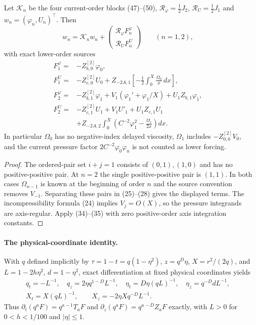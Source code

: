 \begin{proposition}
\label{prop:startup-source-check}
Let $\mathcal K_n$ be the four current-order blocks (47)--(50),
$\mathcal R_\varphi=\tfrac12J_2$, $\mathcal R_U=\tfrac12J_1$
and $w_n=(\varphi_n,U_n)^\top$. Then
\[
w_n=\mathcal K_nw_n+
\begin{pmatrix}\mathcal R_\varphi F_n^\varphi\\
\mathcal R_U F_n^U\end{pmatrix}\qquad(n=1,2),
\]
with exact lower-order sources
\begin{align*}
F_1^\varphi={}&-Z_{b,0}^{[2]}\varphi_0,\\
F_1^U={}&-Z_{c,0}^{[2]}U_0+
 Z_{-2A,1}\left[-\frac12\int_0^X\frac{\Omega_0}{x}\,dx\right],\\
F_2^\varphi={}&-Z_{b,1}^{[2]}\varphi_1+
 V_1(\varphi_1'+\varphi_1/X)+U_1Z_{b,1}\varphi_1,\\
F_2^U={}&-Z_{c,1}^{[2]}U_1+V_1U'_1+U_1Z_{c,1}U_1\\
&+Z_{-2A,2}\int_0^X
  \left(C^{-2}\varphi_1^2-\frac{\Omega_1}{2x}\right)dx .
\end{align*}
In particular $\Omega_0$ has no negative-index delayed viscosity,
$\Omega_1$ includes $-Z^{[2]}_{0,0}V_0$, and the current pressure
factor $2C^{-2}\varphi_0\varphi_n$ is not counted as lower forcing.
\end{proposition}
\begin{proof}
The ordered-pair set $i+j=1$ consists of $(0,1),(1,0)$ and
has no positive-positive pair. At $n=2$ the single positive-positive
pair is $(1,1)$. In both cases $\Omega_{n-1}$ is known at the
beginning of order $n$ and the source convention removes $V_{-1}$.
Separating these pairs in (25)--(28) gives the displayed terms.
The incompressibility formula (24) implies $V_j=O(X)$, so the
pressure integrands are axis-regular. Apply (34)--(35) with zero
positive-order axis integration constants.
\end{proof}

\paragraph{The physical-coordinate identity.}
With $q$ defined implicitly by
$\tau=1-t=q(1-\eta^2)$, $z=q^D\eta$, $X=r^2/(2q)$,
and $L=1-2h\eta^2$, $d=1-\eta^2$, exact differentiation at
fixed physical coordinates yields
\[
\begin{gathered}
q_t=-L^{-1},\quad q_z=2\eta q^{1-D}L^{-1},\quad
\eta_t=D\eta(qL)^{-1},\quad \eta_z=q^{-D}dL^{-1},\\
X_t=X(qL)^{-1},\qquad X_z=-2\eta Xq^{-D}L^{-1}.
\end{gathered}
\]
Thus $\partial_t(q^aF)=q^{a-1}T_aF$ and
$\partial_z(q^aF)=q^{a-D}Z_aF$ exactly, with $L>0$ for
$0<h<1/100$ and $|\eta|\le1$.

